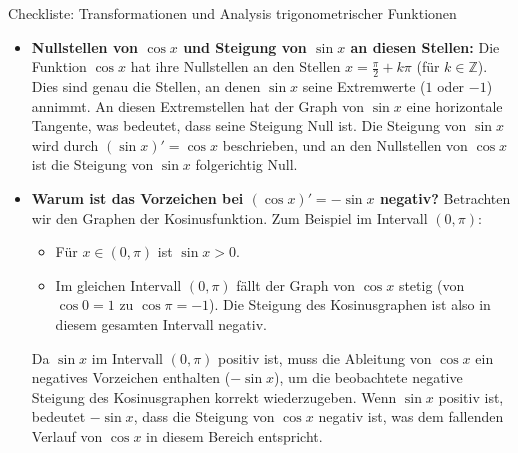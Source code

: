 \begin{loesungsumgebung}{Checkliste: Transformationen und Analysis trigonometrischer Funktionen}
\begin{enumerate}[label=(\alph*)]
\begin{itemize}
        \item \textbf{Nullstellen von $\cos x$ und Steigung von $\sin x$ an diesen Stellen:}
        Die Funktion $\cos x$ hat ihre Nullstellen an den Stellen $x = \frac{\pi}{2} + k\pi$ (für $k \in \mathbb{Z}$).
        Dies sind genau die Stellen, an denen $\sin x$ seine Extremwerte ($1$ oder $-1$) annimmt. An diesen Extremstellen hat der Graph von $\sin x$ eine horizontale Tangente, was bedeutet, dass seine Steigung Null ist. Die Steigung von $\sin x$ wird durch $(\sin x)' = \cos x$ beschrieben, und an den Nullstellen von $\cos x$ ist die Steigung von $\sin x$ folgerichtig Null.

        \item \textbf{Warum ist das Vorzeichen bei $(\cos x)' = -\sin x$ negativ?}
        Betrachten wir den Graphen der Kosinusfunktion. Zum Beispiel im Intervall $(0, \pi)$:
        \begin{itemize}
            \item Für $x \in (0, \pi)$ ist $\sin x > 0$.
            \item Im gleichen Intervall $(0, \pi)$ fällt der Graph von $\cos x$ stetig (von $\cos 0 = 1$ zu $\cos \pi = -1$). Die Steigung des Kosinusgraphen ist also in diesem gesamten Intervall negativ.
        \end{itemize}
        Da $\sin x$ im Intervall $(0, \pi)$ positiv ist, muss die Ableitung von $\cos x$ ein negatives Vorzeichen enthalten ($-\sin x$), um die beobachtete negative Steigung des Kosinusgraphen korrekt wiederzugeben. Wenn $\sin x$ positiv ist, bedeutet $-\sin x$, dass die Steigung von $\cos x$ negativ ist, was dem fallenden Verlauf von $\cos x$ in diesem Bereich entspricht.
    \end{itemize}


\end{enumerate}
\end{loesungsumgebung}
